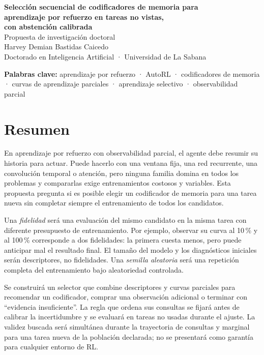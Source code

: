 \documentclass[11pt,letterpaper]{article}
\begin{document}
\begin{center}
{\LARGE\bfseries Selección secuencial de codificadores de memoria para\\[0.2em]
aprendizaje por refuerzo en tareas no vistas,\\[0.2em]
con abstención calibrada}\\[0.8em]
{\large Propuesta de investigación doctoral}\\[0.4em]
Harvey Demian Bastidas Caicedo\\
Doctorado en Inteligencia Artificial · Universidad de La Sabana
\end{center}

\vspace{0.3em}
\noindent\textbf{Palabras clave:}
aprendizaje por refuerzo · AutoRL · codificadores de memoria · curvas de aprendizaje parciales · aprendizaje selectivo · observabilidad parcial

\section*{Resumen}

En aprendizaje por refuerzo con observabilidad parcial, el agente debe resumir su historia para actuar.
Puede hacerlo con una ventana fija, una red recurrente, una convolución temporal o atención, pero ninguna familia domina en todos los problemas y compararlas exige entrenamientos costosos y variables.
Esta propuesta pregunta si es posible elegir un codificador de memoria para una tarea nueva sin completar siempre el entrenamiento de todos los candidatos.

Una \emph{fidelidad} será una evaluación del mismo candidato en la misma tarea con diferente presupuesto de entrenamiento.
Por ejemplo, observar su curva al 10\,\% y al 100\,\% corresponde a dos fidelidades: la primera cuesta menos, pero puede anticipar mal el resultado final.
El tamaño del modelo y los diagnósticos iniciales serán descriptores, no fidelidades.
Una \emph{semilla aleatoria} será una repetición completa del entrenamiento bajo aleatoriedad controlada.

Se construirá un selector que combine descriptores y curvas parciales para recomendar un codificador, comprar una observación adicional o terminar con \enquote{evidencia insuficiente}.
La regla que ordena sus consultas se fijará antes de calibrar la incertidumbre y se evaluará en tareas no usadas durante el ajuste.
La validez buscada será simultánea durante la trayectoria de consultas y marginal para una tarea nueva de la población declarada; no se presentará como garantía para cualquier entorno de RL.
\end{document}

